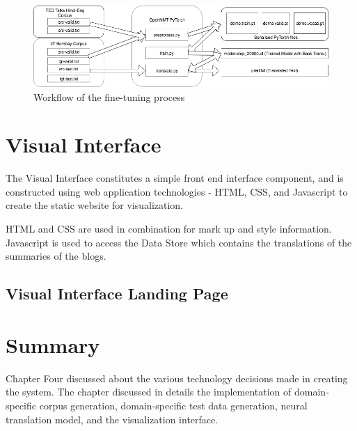 \begin{figure}[h]
\includegraphics[width=\textwidth]{figures/nmtworkflow1.png}
\caption{Workflow of the fine-tuning process} 
\label{nmtwork1}
\end{figure}

\section{Visual Interface}
The Visual Interface constitutes a simple front end interface component, and is constructed using web application technologies - HTML, CSS, and Javascript to create the static website for visualization.

HTML and CSS are used in combination for mark up and style information. Javascript is used to access the Data Store which contains the translations of the summaries of the blogs.

\subsection{Visual Interface Landing Page}
\section{Summary}
Chapter Four discussed about the various technology decisions made in creating the system. The chapter discussed in details the implementation of domain-specific corpus generation, domain-specific test data generation, neural translation model, and the visualization interface.